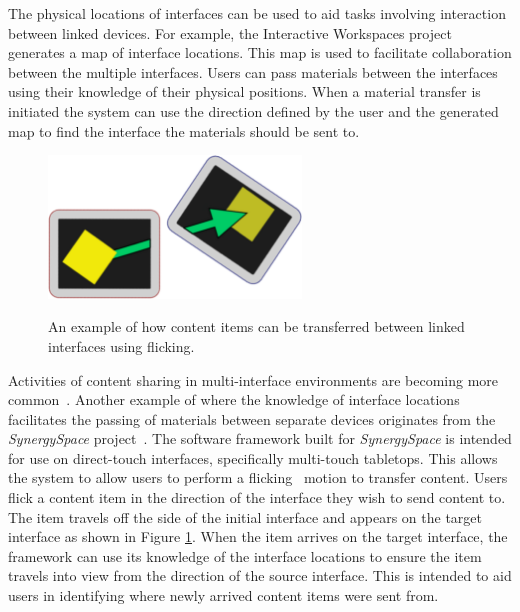 \documentclass{bmcart}
\begin{document}
The physical locations of interfaces can be used to aid tasks involving interaction between linked devices.
For example, the Interactive Workspaces project~\cite{Johanson2002} generates a map of interface locations.
This map is used to facilitate collaboration between the multiple interfaces.
Users can pass materials between the interfaces using their knowledge of their physical positions.
When a material transfer is initiated the system can use the direction defined by the user and the generated map to find the interface the materials should be sent to.

\begin{figure}[h!]
   \centering
   \caption{An example of how content items can be transferred between linked interfaces using flicking.}
   \includegraphics[width=0.6\textwidth]{figures/flicking.png}
   \label{fig:flick}
\end{figure}

Activities of content sharing in multi-interface environments are becoming more common~\cite{Nacenta2009}.
Another example of where the knowledge of interface locations facilitates the passing of materials between separate devices originates from the {\emph{SynergySpace}} project~\cite{Burd2009}.
The software framework built for {\emph{SynergySpace}} is intended for use on direct-touch interfaces, specifically multi-touch tabletops.
This allows the system to allow users to perform a flicking~\cite{Reetz2006} motion to transfer content.
Users flick a content item in the direction of the interface they wish to send content to.
The item travels off the side of the initial interface and appears on the target interface as shown in Figure \ref{fig:flick}.
When the item arrives on the target interface, the framework can use its knowledge of the interface locations to ensure the item travels into view from the direction of the source interface.
This is intended to aid users in identifying where newly arrived content items were sent from.
\end{document}
